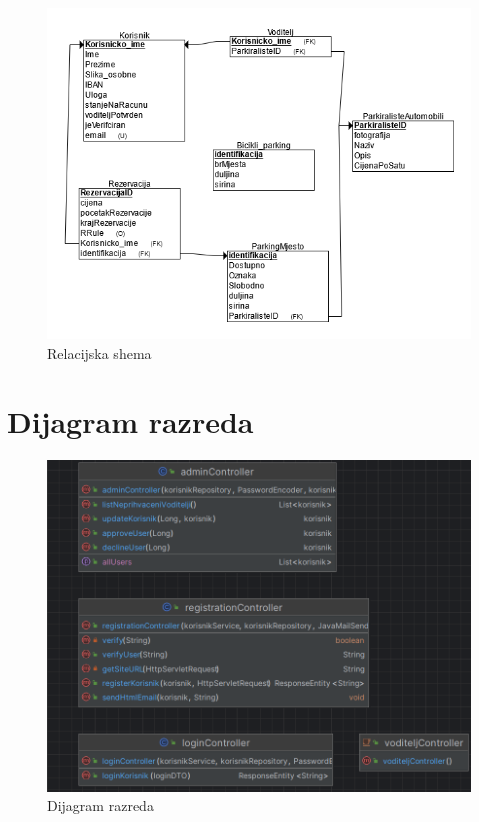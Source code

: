 				\begin{figure}[H]
					\includegraphics[scale=0.7]{slike/rlcdiagram.PNG} %
					\caption{Relacijska shema}
					\label{fig:relshema} %
				\end{figure}
				
				
				
				
				
			
			
			
			
			
			\eject
			
			
		\section{Dijagram razreda}
		
			\begin{figure}[H]
				\includegraphics[width=\textwidth]{slike/dijagram_razred1.PNG} %
				\centering
				\caption{Dijagram razreda}
			\end{figure}
			
